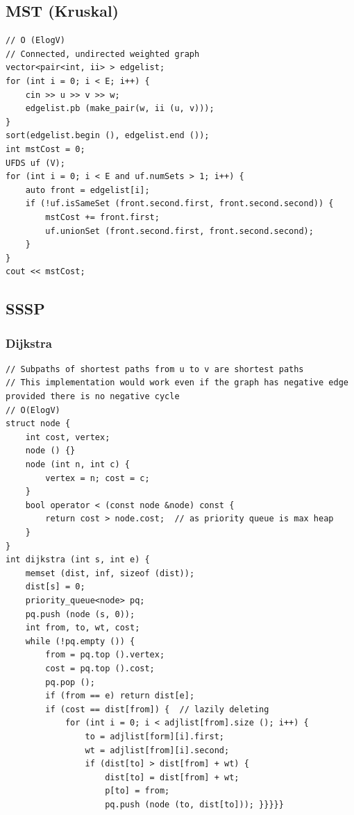 \documentclass[8pt, a4paper, oneside, twocolumn]{extarticle}
\begin{document}
\subsection{MST (Kruskal)}
\begin{verbatim}
// O (ElogV)
// Connected, undirected weighted graph
vector<pair<int, ii> > edgelist;
for (int i = 0; i < E; i++) {
    cin >> u >> v >> w;
    edgelist.pb (make_pair(w, ii (u, v)));
}
sort(edgelist.begin (), edgelist.end ());
int mstCost = 0;
UFDS uf (V);
for (int i = 0; i < E and uf.numSets > 1; i++) {
    auto front = edgelist[i];
    if (!uf.isSameSet (front.second.first, front.second.second)) {
        mstCost += front.first;
        uf.unionSet (front.second.first, front.second.second);
    }
}
cout << mstCost;
\end{verbatim}
\subsection{SSSP}
\subsubsection{Dijkstra}
\begin{verbatim}
// Subpaths of shortest paths from u to v are shortest paths
// This implementation would work even if the graph has negative edge provided there is no negative cycle
// O(ElogV)
struct node {
    int cost, vertex;
    node () {}
    node (int n, int c) {
        vertex = n; cost = c;
    }
    bool operator < (const node &node) const {
        return cost > node.cost;  // as priority queue is max heap
    }
}
int dijkstra (int s, int e) {
    memset (dist, inf, sizeof (dist));
    dist[s] = 0;
    priority_queue<node> pq;
    pq.push (node (s, 0));
    int from, to, wt, cost;
    while (!pq.empty ()) {
        from = pq.top ().vertex;
        cost = pq.top ().cost;
        pq.pop ();
        if (from == e) return dist[e];
        if (cost == dist[from]) {  // lazily deleting
            for (int i = 0; i < adjlist[from].size (); i++) {
                to = adjlist[form][i].first;
                wt = adjlist[from][i].second;
                if (dist[to] > dist[from] + wt) {
                    dist[to] = dist[from] + wt;
                    p[to] = from;
                    pq.push (node (to, dist[to])); }}}}}
\end{verbatim}
\end{document}

